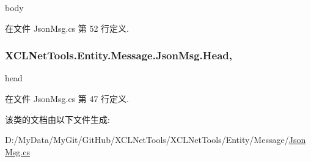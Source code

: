 body 



在文件 Json\-Msg.\-cs 第 52 行定义.

\hypertarget{class_x_c_l_net_tools_1_1_entity_1_1_message_1_1_json_msg_a563af2b66f8c22c04ff557cfe34f2479}{
\subsubsection[{Head}]{ X\-C\-L\-Net\-Tools.\-Entity.\-Message.\-Json\-Msg.\-Head\hspace{0.3cm}{\ttfamily [get]}, {\ttfamily [set]}}}\label{class_x_c_l_net_tools_1_1_entity_1_1_message_1_1_json_msg_a563af2b66f8c22c04ff557cfe34f2479}


head 



在文件 Json\-Msg.\-cs 第 47 行定义.



该类的文档由以下文件生成\-:\begin{DoxyCompactItemize}
\item 
D\-:/\-My\-Data/\-My\-Git/\-Git\-Hub/\-X\-C\-L\-Net\-Tools/\-X\-C\-L\-Net\-Tools/\-Entity/\-Message/\hyperlink{_json_msg_8cs}{Json\-Msg.\-cs}\end{DoxyCompactItemize}
